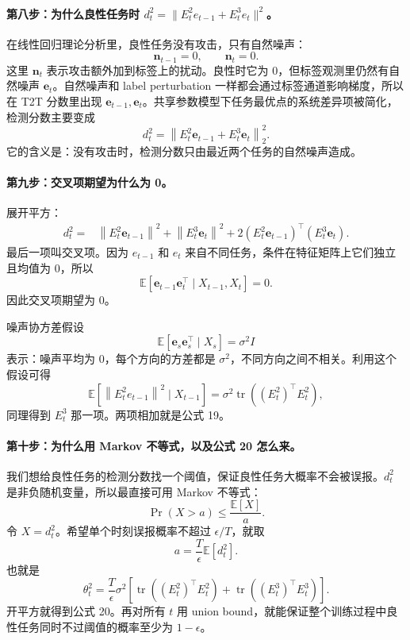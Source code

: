 \documentclass[UTF8,fontset=none,11pt]{ctexart}
\theoremstyle{cnstyle}
\newcommand{\E}{\mathbb{E}}
\newcommand{\tr}{\operatorname{tr}}
\newcommand{\norm}[1]{\left\lVert #1\right\rVert}
\begin{document}
\paragraph{第八步：为什么良性任务时 \(d_t^2=\|E_t^2e_{t-1}+E_t^3e_t\|^2\)。}
在线性回归理论分析里，良性任务没有攻击，只有自然噪声：
\[
  \mathbf n_{t-1}=0,\qquad \mathbf n_t=0.
\]
这里 \(\mathbf n_t\) 表示攻击额外加到标签上的扰动。良性时它为 0，但标签观测里仍然有自然噪声 \(\mathbf e_t\)。自然噪声和 label perturbation 一样都会通过标签通道影响梯度，所以在 T2T 分数里出现 \(\mathbf e_{t-1},\mathbf e_t\)。共享参数模型下任务最优点的系统差异项被简化，检测分数主要变成
\[
  d_t^2
  =
  \norm{E_t^2\mathbf e_{t-1}+E_t^3\mathbf e_t}_2^2.
\]
它的含义是：没有攻击时，检测分数只由最近两个任务的自然噪声造成。

\paragraph{第九步：交叉项期望为什么为 0。}
展开平方：
\begin{align*}
  d_t^2
  =&
  \norm{E_t^2\mathbf e_{t-1}}^2
  +\norm{E_t^3\mathbf e_t}^2
  +2(E_t^2\mathbf e_{t-1})^\top(E_t^3\mathbf e_t).
\end{align*}
最后一项叫交叉项。因为 \(e_{t-1}\) 和 \(e_t\) 来自不同任务，条件在特征矩阵上它们独立且均值为 0，所以
\[
  \E[\mathbf e_{t-1}\mathbf e_t^\top\mid X_{t-1},X_t]=0.
\]
因此交叉项期望为 0。

噪声协方差假设
\[
  \E[\mathbf e_s\mathbf e_s^\top\mid X_s]=\sigma^2I
\]
表示：噪声平均为 0，每个方向的方差都是 \(\sigma^2\)，不同方向之间不相关。利用这个假设可得
\[
  \E[\norm{E_t^2e_{t-1}}^2\mid X_{t-1}]
  =
  \sigma^2\tr((E_t^2)^\top E_t^2),
\]
同理得到 \(E_t^3\) 那一项。两项相加就是公式 19。

\paragraph{第十步：为什么用 Markov 不等式，以及公式 20 怎么来。}
我们想给良性任务的检测分数找一个阈值，保证良性任务大概率不会被误报。\(d_t^2\) 是非负随机变量，所以最直接可用 Markov 不等式：
\[
  \Pr(X>a)\le\frac{\E[X]}{a}.
\]
令 \(X=d_t^2\)。希望单个时刻误报概率不超过 \(\epsilon/T\)，就取
\[
  a=\frac{T}{\epsilon}\E[d_t^2].
\]
也就是
\[
  \theta_t^2
  =
  \frac{T}{\epsilon}
  \sigma^2
  \left[
  \tr((E_t^2)^\top E_t^2)
  +
  \tr((E_t^3)^\top E_t^3)
  \right].
\]
开平方就得到公式 20。再对所有 \(t\) 用 union bound，就能保证整个训练过程中良性任务同时不过阈值的概率至少为 \(1-\epsilon\)。
\end{document}
